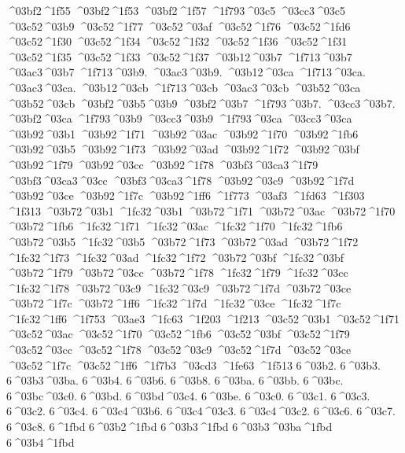 {^^^^03bf2^^^^1f55
^^^^03bf2^^^^1f53
^^^^03bf2^^^^1f57
^^^^1f793^^^^03c5  ^^^^03cc3^^^^03c5
^^^^03c52^^^^03b9
^^^^03c52^^^^1f77  ^^^^03c52^^^^03af
^^^^03c52^^^^1f76
^^^^03c52^^^^1fd6
^^^^03c52^^^^1f30
^^^^03c52^^^^1f34
^^^^03c52^^^^1f32
^^^^03c52^^^^1f36
^^^^03c52^^^^1f31
^^^^03c52^^^^1f35
^^^^03c52^^^^1f33
^^^^03c52^^^^1f37
^^^^03b12^^^^03b7
^^^^1f713^^^^03b7  ^^^^03ac3^^^^03b7
^^^^1f713^^^^03b9.  ^^^^03ac3^^^^03b9.
^^^^03b12^^^^03ca
^^^^1f713^^^^03ca.  ^^^^03ac3^^^^03ca.
^^^^03b12^^^^03cb
^^^^1f713^^^^03cb  ^^^^03ac3^^^^03cb
^^^^03b52^^^^03ca
^^^^03b52^^^^03cb
^^^^03bf2^^^^03b5^^^^03b9
^^^^03bf2^^^^03b7
^^^^1f793^^^^03b7.  ^^^^03cc3^^^^03b7.
^^^^03bf2^^^^03ca
^^^^1f793^^^^03b9  ^^^^03cc3^^^^03b9
^^^^1f793^^^^03ca  ^^^^03cc3^^^^03ca
^^^^03b92^^^^03b1
^^^^03b92^^^^1f71  ^^^^03b92^^^^03ac
^^^^03b92^^^^1f70
^^^^03b92^^^^1fb6
^^^^03b92^^^^03b5
^^^^03b92^^^^1f73  ^^^^03b92^^^^03ad
^^^^03b92^^^^1f72
^^^^03b92^^^^03bf
^^^^03b92^^^^1f79  ^^^^03b92^^^^03cc
^^^^03b92^^^^1f78
^^^^03bf3^^^^03ca3^^^^1f79  ^^^^03bf3^^^^03ca3^^^^03cc
^^^^03bf3^^^^03ca3^^^^1f78
^^^^03b92^^^^03c9
^^^^03b92^^^^1f7d  ^^^^03b92^^^^03ce
^^^^03b92^^^^1f7c
^^^^03b92^^^^1ff6
^^^^1f773  ^^^^03af3
^^^^1fd63
^^^^1f303
^^^^1f313
^^^^03b72^^^^03b1
^^^^1fc32^^^^03b1
^^^^03b72^^^^1f71  ^^^^03b72^^^^03ac
^^^^03b72^^^^1f70
^^^^03b72^^^^1fb6
^^^^1fc32^^^^1f71  ^^^^1fc32^^^^03ac
^^^^1fc32^^^^1f70
^^^^1fc32^^^^1fb6
^^^^03b72^^^^03b5
^^^^1fc32^^^^03b5
^^^^03b72^^^^1f73  ^^^^03b72^^^^03ad
^^^^03b72^^^^1f72
^^^^1fc32^^^^1f73  ^^^^1fc32^^^^03ad
^^^^1fc32^^^^1f72
^^^^03b72^^^^03bf
^^^^1fc32^^^^03bf
^^^^03b72^^^^1f79  ^^^^03b72^^^^03cc
^^^^03b72^^^^1f78
^^^^1fc32^^^^1f79  ^^^^1fc32^^^^03cc
^^^^1fc32^^^^1f78
^^^^03b72^^^^03c9
^^^^1fc32^^^^03c9
^^^^03b72^^^^1f7d  ^^^^03b72^^^^03ce
^^^^03b72^^^^1f7c
^^^^03b72^^^^1ff6
^^^^1fc32^^^^1f7d  ^^^^1fc32^^^^03ce
^^^^1fc32^^^^1f7c
^^^^1fc32^^^^1ff6
^^^^1f753  ^^^^03ae3
^^^^1fc63
^^^^1f203
^^^^1f213
^^^^03c52^^^^03b1
^^^^03c52^^^^1f71  ^^^^03c52^^^^03ac
^^^^03c52^^^^1f70
^^^^03c52^^^^1fb6
^^^^03c52^^^^03bf
^^^^03c52^^^^1f79  ^^^^03c52^^^^03cc
^^^^03c52^^^^1f78
^^^^03c52^^^^03c9
^^^^03c52^^^^1f7d  ^^^^03c52^^^^03ce
^^^^03c52^^^^1f7c
^^^^03c52^^^^1ff6
^^^^1f7b3  ^^^^03cd3
^^^^1fe63
^^^^1f513
6^^^^03b2.
6^^^^03b3.
6^^^^03b3^^^^03ba.
6^^^^03b4.
6^^^^03b6.
6^^^^03b8.
6^^^^03ba.
6^^^^03bb.
6^^^^03bc.
6^^^^03bc^^^^03c0.
6^^^^03bd.
6^^^^03bd^^^^03c4.
6^^^^03be.
6^^^^03c0.
6^^^^03c1.
6^^^^03c3.
6^^^^03c2.
6^^^^03c4.
6^^^^03c4^^^^03b6.
6^^^^03c4^^^^03c3.
6^^^^03c4^^^^03c2.
6^^^^03c6.
6^^^^03c7.
6^^^^03c8.
6^^^^1fbd
6^^^^03b2^^^^1fbd
6^^^^03b3^^^^1fbd
6^^^^03b3^^^^03ba^^^^1fbd
6^^^^03b4^^^^1fbd
}
